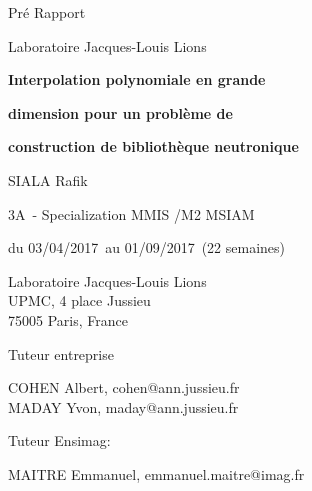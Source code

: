 \documentclass[12pt,a4paper]{report}
\makeatletter
\newcommand{\organizationName}{Laboratoire Jacques-Louis Lions}                                                                       %
\newcommand{\organizationAdress}{Laboratoire Jacques-Louis Lions \\ UPMC, 4 place Jussieu \\ 75005 Paris, France}                     %
\newcommand{\internshipTitlePartOne}{Interpolation polynomiale en grande}                                                          %
\newcommand{\internshipTitlePartTwo}{dimension pour un problème de}                                                                   %
\newcommand{\internshipTitlePartThree}{construction de bibliothèque neutronique}                                                                    %
\newcommand{\authorName}{SIALA Rafik}                                                                                                 %
\newcommand{\classYear}{3A}                                                                                                           %
\newcommand{\specialization}{MMIS /M2 MSIAM}                                                                                          %
\newcommand{\startDate}{03/04/2017}                                                                                                   %
\newcommand{\varendDate}{01/09/2017}                                                                                                  %
\newcommand{\duration}{22 semaines}                                                                                                   %
\newcommand{\internshipSupervisor}{ COHEN Albert, cohen@ann.jussieu.fr \\ MADAY Yvon, maday@ann.jussieu.fr  }                         %
\newcommand{\reviewerName}{ MAITRE Emmanuel, emmanuel.maitre@imag.fr}                                                                 %
\newcommand{\grayIntensity}{25}
\makeatother
\begin{document}
\begin{titlepage}
	\vspace{1.5cm}

	{Pré Rapport \par}

	\vspace{1.5cm}

	{\large\organizationName\par}

	\vspace{1.5cm}

  {\huge\bfseries\colorbox{gray!\grayIntensity}{\internshipTitlePartOne}\par}
  {\huge\bfseries\colorbox{gray!\grayIntensity}{\internshipTitlePartTwo}\par}
  {\huge\bfseries\colorbox{gray!\grayIntensity}{\internshipTitlePartThree}\par}

	\vspace{2cm}

	{\large\authorName\par}

	\vspace{0.5cm}

	{\large\classYear\ - Specialization \specialization\par}

	\vspace{1cm}

	{\normalsize du \startDate\ au \varendDate\ (\duration)\par}

    \vfill

    \begin{minipage}[t]{7cm}
        \flushleft


        \organizationAdress
    \end{minipage}
    \hfill
    \begin{minipage}[t]{7cm}
        \flushright
        \footnotesize Tuteur entreprise

        \internshipSupervisor

        \footnotesize Tuteur Ensimag:

        \reviewerName


    \end{minipage}

\end{titlepage}
\newpage
\tableofcontents
\newpage
\listoffigures
\newpage
\listoftables
\newpage
\end{document}
